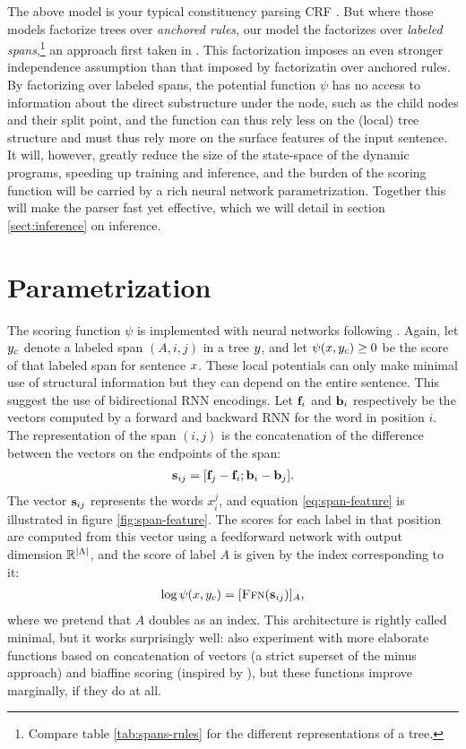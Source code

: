     The above model is your typical constituency parsing CRF \citep{finkel2008crf,klein2015crf}. But where those models factorize trees over \textit{anchored rules}, our model the factorizes over \textit{labeled spans},\footnote{Compare table \ref{tab:spans-rules} for the different representations of a tree.} an approach first taken in \citet{stern2017minimal}. This factorization imposes an even stronger independence assumption than that imposed by factorizatin over anchored rules. By factorizing over labeled spans, the potential function $\psi$ has no access to information about the direct substructure under the node, such as the child nodes and their split point, and the function can thus rely less on the (local) tree structure and must thus rely more on the surface features of the input sentence. It will, however, greatly reduce the size of the state-space of the dynamic programs, speeding up training and inference, and the burden of the scoring function will be carried by a rich neural network parametrization. Together this will make the parser fast yet effective, which we will detail in section \ref{sect:inference} on inference.

\section{Parametrization}
  The scoring function $\psi$ is implemented with neural networks following \citet{stern2017minimal}. Again, let $y_c$ denote a labeled span $(A, i, j)$ in a tree $y$, and let $\psi(x, y_c) \geq 0$ be the score of that labeled span for sentence $x$. These local potentials can only make minimal use of structural information but they can depend on the entire sentence. This suggest the use of bidirectional RNN encodings. Let $\mathbf{f}_i$ and $\mathbf{b}_i$ respectively be the vectors computed by a forward and backward RNN for the word in position $i$. The representation of the span $(i, j)$ is the concatenation of the difference between the vectors on the endpoints of the span:
  \begin{align}
    \label{eq:span-feature}
    \mathbf{s}_{ij} = [\mathbf{f}_j - \mathbf{f}_i; \mathbf{b}_i - \mathbf{b}_j].
  \end{align}
  The vector $\mathbf{s}_{ij}$ represents the words $x_i^j$, and equation \ref{eq:span-feature} is illustrated in figure \ref{fig:span-feature}. The scores for each label in that position are computed from this vector using a feedforward network with output dimension $\mathbb{R}^{\lvert \Lambda \rvert}$, and the score of label $A$ is given by the index corresponding to it:
  \begin{align}
    \label{eq:potential-function}
    \log \psi(x, y_c) = [ \textsc{Ffn}( \mathbf{s}_{ij} ) ]_{A},
  \end{align}
  where we pretend that $A$ doubles as an index. This architecture is rightly called minimal, but it works surprisingly well: \citet{stern2017minimal} also experiment with more elaborate functions based on concatenation of vectors (a strict superset of the minus approach) and biaffine scoring (inspired by \citet{dozat2016deep}), but these functions improve marginally, if they do at all.

